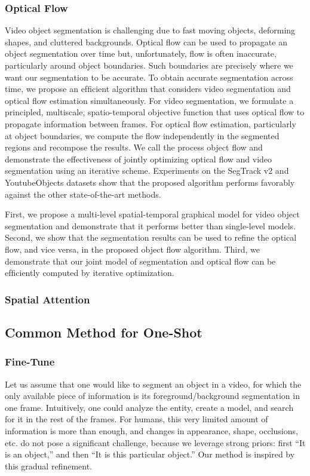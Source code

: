 \subsubsection{Optical Flow}
Video object segmentation is challenging due to fast moving objects, deforming shapes, and cluttered backgrounds. Optical ﬂow can be used to propagate an object segmentation over time but, unfortunately, ﬂow is often inaccurate, particularly around object boundaries. Such boundaries are precisely where we want our segmentation to be accurate. To obtain accurate segmentation across time, we propose an efﬁcient algorithm that considers video segmentation and optical ﬂow estimation simultaneously. For video segmentation, we formulate a principled, multiscale, spatio-temporal objective function that uses optical ﬂow to propagate information between frames. For optical ﬂow estimation, particularly at object boundaries, we compute the ﬂow independently in the segmented regions and recompose the results. We call the process object ﬂow and demonstrate the effectiveness of jointly optimizing optical ﬂow and video segmentation using an iterative scheme. Experiments on the SegTrack v2 and YoutubeObjects datasets show that the proposed algorithm performs favorably against the other state-of-the-art methods.

First, we propose a multi-level spatial-temporal graphical model for video object segmentation and demonstrate that it performs better than single-level models. Second, we show that the segmentation results can be used to reﬁne the optical ﬂow, and vice versa, in the proposed object ﬂow algorithm. Third, we demonstrate that our joint model of segmentation and optical ﬂow can be efﬁciently computed by iterative optimization.

\subsubsection{Spatial Attention}

\subsection{Common Method for One-Shot}

\subsubsection{Fine-Tune}
Let us assume that one would like to segment an object in a video, for which the only available piece of information is its foreground/background segmentation in one frame. Intuitively, one could analyze the entity, create a model, and search for it in the rest of the frames. For humans, this very limited amount of information is more than enough, and changes in appearance, shape, occlusions, etc. do not pose a signiﬁcant challenge, because we leverage strong priors: ﬁrst “It is an object,” and then “It is this particular object.” Our method is inspired by this gradual reﬁnement.


